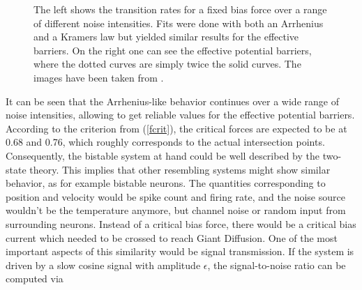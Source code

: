 \documentclass[12pt,a4paper]{article}
\begin{document}
\begin{figure}[H]
	\caption{The left shows the transition rates for a fixed bias force over a range of different noise intensities. Fits were done with both an Arrhenius and a Kramers law but yielded similar results for the effective barriers. On the right one can see the effective potential barriers, where the dotted curves are simply twice the solid curves.  The images have been taken from \cite{bpp}.}
	\label{ratesintro} 
\end{figure}
It can be seen that the Arrhenius-like behavior continues over a wide range of noise intensities, allowing to get reliable values for the effective potential barriers. According to the criterion from (\ref{fcrit}), the critical forces are expected to be at 0.68 and 0.76, which roughly corresponds to the actual intersection points.\\
Consequently, the bistable system at hand could be well described by the two-state theory. This implies that other resembling systems might show similar behavior, as for example bistable neurons. The quantities corresponding to position and velocity would be spike count and firing rate, and the noise source wouldn't be the temperature anymore, but channel noise or random input from surrounding neurons.
Instead of a critical bias force, there would be a critical bias current which needed to be crossed to reach Giant Diffusion. One of the most important aspects of this similarity would be signal transmission. If the system is driven by a slow cosine signal with amplitude $\epsilon$, the signal-to-noise ratio can be computed via\cite{snr}
\end{document}
